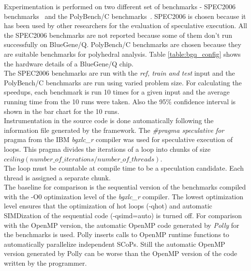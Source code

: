\documentclass[10pt]{report}          %
\begin{document}
Experimentation is performed on two different set of benchmarks - SPEC2006 benchmarks~\cite{spec}  and the PolyBench/C benchmarks~\cite{polybench}.  SPEC2006 is chosen because it has been used by other researchers for the evaluation of speculative execution. All the SPEC2006 benchmarks are not reported because some of them don't run successfully on BlueGene/Q.  PolyBench/C benchmarks are chosen because they are suitable benchmarks for polyhedral analysis.  Table \ref{table:bgq_config} shows the hardware details of a BlueGene/Q chip. \\
 
The SPEC2006 benchmarks are run with the \textit{ref, train and test} input and the PolyBench/C benchmarks are run using varied problem size.  For calculating the speedups, each benchmark is run 10 times for a given input and the average running time from the 10 runs were taken. Also the 95\% confidence interval is shown in the bar chart for the 10 runs.\\

Instrumentation in the source code is done automatically following the information file generated by the framework.  The \textit{\#pragma speculative for} pragma from the IBM \textit{bgxlc\_r} compiler was used for speculative execution of loops.  This pragma divides the iterations of a loop into chunks of size
$ceiling(number\_of\_iterations/number\_of\_threads)$. \\

The loop must be countable at compile time to be a speculation candidate.  Each thread is assigned a separate chunk.\\

The baseline for comparison is the sequential version of the benchmarks compiled with the -O0 optimization level of the \textit{bgxlc\_r} compiler.  The lowest optimization level ensures that the optimization of hot loops (-qhot) and automatic SIMDization of the sequential code (-qsimd=auto) is turned off. For comparison with the OpenMP version, the automatic OpenMP code generated by \textit{Polly} for the benchmarks is used.  Polly inserts calls to OpenMP runtime functions to automatically parallelize independent SCoPs. Still the automatic OpenMP version generated by Polly can be worse than the OpenMP version of the code written by the programmer.
\end{document}
